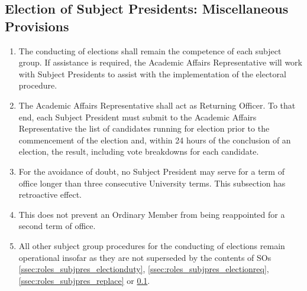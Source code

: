 \subsection{Election of Subject Presidents: Miscellaneous Provisions} \label{ssec:roles_subjpres_electionmisc}
\begin{enumerate}
    \item The conducting of elections shall remain the competence of each subject group. If assistance is required, the Academic Affairs Representative will work with Subject Presidents to assist with the implementation of the electoral procedure.
    \item The Academic Affairs Representative shall act as Returning Officer. To that end, each Subject President must submit to the Academic Affairs Representative the list of candidates running for election prior to the commencement of the election and, within 24 hours of the conclusion of an election, the result, including vote breakdowns for each candidate.
    \item For the avoidance of doubt, no Subject President may serve for a term of office longer than three consecutive University terms. This subsection has retroactive effect.
    \item This does not prevent an Ordinary Member from being reappointed for a second term of office.
    \item All other subject group procedures for the conducting of elections remain operational insofar as they are not superseded by the contents of SOs \ref{ssec:roles_subjpres_electionduty}, \ref{ssec:roles_subjpres_electionreq}, \ref{ssec:roles_subjpres_replace} or \ref{ssec:roles_subjpres_electionmisc}.
\end{enumerate}
